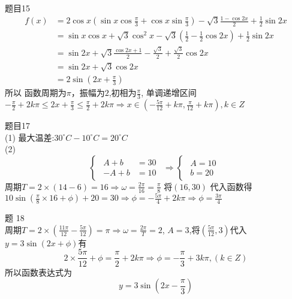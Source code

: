 \documentclass{article}
\newcommand \row[1]{$\displaystyle #1$}
\begin{document}
\noindent 
题目15
\begin{equation*}
\begin{split}
f(x)&=2\cos{x} (\sin{x}\cos{\frac{\pi}{3}}+\cos{x}\sin{\frac{\pi}{3}}) -\sqrt{3} \frac{1-\cos{2x}}{2}+\frac{1}{2}\sin{2x} \\
&=\sin{x}\cos{x}+\sqrt{3}\cos^2{x}-\sqrt{3}(\frac{1}{2}-\frac{1}{2}\cos{2x}) +\frac{1}{2}\sin{2x} \\
&= \sin{2x}+\sqrt{3}\frac{\cos{2x}+1}{2} -\frac{\sqrt{3}}{2}+
\frac{\sqrt{3}}{2}\cos{2x}\\
&= \sin{2x} +\sqrt{3}\cos{2x} \\
&= 2\sin{(2x+\frac{\pi}{3})}
\end{split}
\end{equation*}
所以 函数周期为\row{\pi}，振幅为\row{2},初相为\row{\frac{\pi}{3}},
单调递增区间 \row{-\frac{\pi}{2}+2k\pi \le 2x+\frac{\pi}{3}\le \frac{\pi}{2}+2k\pi}\row{\Longrightarrow x\in (-\frac{5\pi}{12}+k\pi,\frac{\pi}{12}+k\pi),k\in Z}

题目17 \\
(1) 最大温差:$30^{\circ}C -10^{\circ}C=20^{\circ}C$\\ 
(2) 
\begin{equation*}
\begin{cases}
\begin{split}
A+b&=30 \\
-A+b&=10 
\end{split}
\end{cases}
\Longrightarrow 
\begin{cases}
\begin{split}
A=10 \\
b=20
\end{split}
\end{cases}
\end{equation*}
周期\row{T=2\times(14-6)=16\Longrightarrow \omega=\frac{2\pi}{16}=\frac{\pi}{8}}
将\row{(16,30)} 代入函数得\row{10\sin{(\frac{\pi}{8}\times 16+\phi)}+20=30}\row{\Longrightarrow \phi=-\frac{5\pi}{4}+2k\pi \Longrightarrow 
\phi=\frac{3\pi}{4}}

题 18\\
周期\row{T=2\times(\frac{11\pi}{12}-\frac{5\pi}{12})=\pi \Longrightarrow \omega=\frac{2\pi}{T}=2}, 
\row{A=3},将\row{(\frac{5\pi}{12},3)}代入\row{y=3\sin{(2x+\phi)}}有
\[2\times \frac{5\pi}{12}+\phi=\frac{\pi}{2}+2k\pi \Longrightarrow \phi=-\frac{\pi}{3}+3k\pi,(k\in Z)\] 
所以函数表达式为\[y=3\sin{(2x-\frac{\pi}{3})}\]
\end{document}
